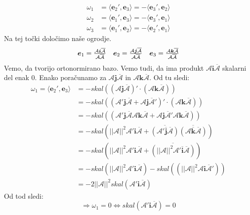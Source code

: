 \documentclass[mat1]{fmfdelo}
\newcommand{\ii}{\boldsymbol i}
\newcommand{\jj}{\boldsymbol j}
\newcommand{\kk}{\boldsymbol k}
\newcommand{\e}{\boldsymbol e}
\newcommand{\A}{\mathcal A}
\begin{document}
\begin{dokaz}
\begin{equation}
\begin{split}
\omega_1 &= \langle \e_2', \e_3 \rangle = - \langle \e_3', \e_2 \rangle \\
\omega_2 &= \langle \e_1', \e_3 \rangle = - \langle \e_3', \e_1 \rangle \\
\omega_3 &= \langle \e_1', \e_2 \rangle = - \langle \e_2', \e_1 \rangle 
\end{split}
\end{equation}
Na tej točki določimo naše ogrodje.
\begin{equation*}
\begin{array}{c c c}
\e_1 = \frac{\A \ii \overline{\A}}{\A \overline{\A}} &
\e_2 = \frac{\A \jj \overline{\A}}{\A \overline{\A}} &
\e_3 = \frac{\A \kk \overline{\A}}{\A \overline{\A}}
\end{array}
\end{equation*}
Vemo, da tvorijo ortonormirano bazo. Vemo tudi, da ima produkt $\A \ii \overline{\A}$ skalarni del enak 0. Enako poračunamo za $\A \jj \overline{\A}$ in $\A \kk \overline{\A}$. Od tu sledi:
\begin{equation*}
\begin{split}
	\omega_1 = \langle \e_2', \e_3 \rangle& = -skal \left( \left( \A \jj \overline{\A} \right)' \cdot \left( \A \kk \overline{\A}  \right) \right) \\
	&= -skal \left( \left( \A' \jj \overline{\A} + \A \jj \overline{\A}' \right)' \cdot \left( \A \kk \overline{\A}  \right) \right) \\
	&= -skal \left( \left( \A' \jj \overline{\A} \A \kk \overline{\A}+ \A \jj \overline{\A}' \A \kk \overline{\A}  \right) \right) \\
	&= -skal \left( ||\A||^2 \A' \ii \overline{\A}+ \overline{\left(\A' \overline{\jj} \overline{\A}\right)} \overline{ \left( \A \overline{\kk} \overline{\A} \right) }\right) \\
	&= -skal \left( ||\A||^2 \A' \ii \overline{\A}+ \overline{\left( ||\A||^2 \A' \overline{\ii} \overline{\A}\right)} \right) \\
	&= -skal \left( ||\A||^2 \A' \ii \overline{\A} \right)-skal \left(\left( ||\A||^2 \A \ii \overline{\A}'\right) \right) \\
	&= -2||\A||^2 skal \left( \A' \ii \overline{\A}\right)
\end{split}
\end{equation*}
Od tod sledi:
\begin{equation*}
\Longrightarrow \omega_1 = 0 \Leftrightarrow skal \left( \A' \ii \overline{\A} \right) = 0
\end{equation*}
\end{dokaz}
\end{document}
